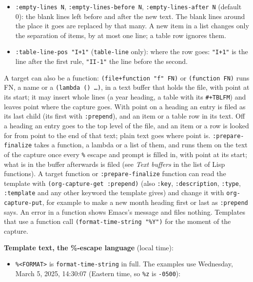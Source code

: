 \documentclass[11pt]{article}
\begin{document}
\begin{itemize}
\item \texttt{:empty-lines N}, \texttt{:empty-lines-before N}, \texttt{:empty-lines-after N} (default 0): the blank lines left before and after the new text. The blank lines around the place it goes are replaced by that many. A new item in a list changes only the separation of items, by at most one line; a table row ignores them.
\item \texttt{:table-line-pos "I+1"} (\texttt{table-line} only): where the row goes: \texttt{"I+1"} is the line after the first rule, \texttt{"II-1"} the line before the second.
\end{itemize}

A target can also be a function: \texttt{(file+function "f" FN)} or \texttt{(function FN)} runs FN, a name or a \texttt{(lambda () …)}, in a text buffer that holds the file, with point at its start; it may insert whole lines (a year heading, a table with its \texttt{\#+TBLFM}) and leaves point where the capture goes. With point on a heading an entry is filed as its last child (its first with \texttt{:prepend}), and an item or a table row in its text. Off a heading an entry goes to the top level of the file, and an item or a row is looked for from point to the end of that text; plain text goes where point is. \texttt{:prepare-finalize} takes a function, a lambda or a list of them, and runs them on the text of the capture once every \texttt{\%} escape and prompt is filled in, with point at its start; what is in the buffer afterwards is filed (see \emph{Text buffers} in the list of Lisp functions). A target function or \texttt{:prepare-finalize} function can read the template with \texttt{(org-capture-get :prepend)} (also \texttt{:key}, \texttt{:description}, \texttt{:type}, \texttt{:template} and any other keyword the template gives) and change it with \texttt{org-capture-put}, for example to make a new month heading first or last as \texttt{:prepend} says. An error in a function shows Emacs's message and files nothing. Templates that use a function call \texttt{(format-time-string "\%Y")} for the moment of the capture.

\textbf{Template text, the \%-escape language} (local time):

\begin{itemize}
\item \texttt{\%<FORMAT>} is \texttt{format-time-string} in full. The examples use Wednesday, March 5, 2025, 14:30:07 (Eastern time, so \texttt{\%z} is \texttt{-0500}):
\end{itemize}
\end{document}
